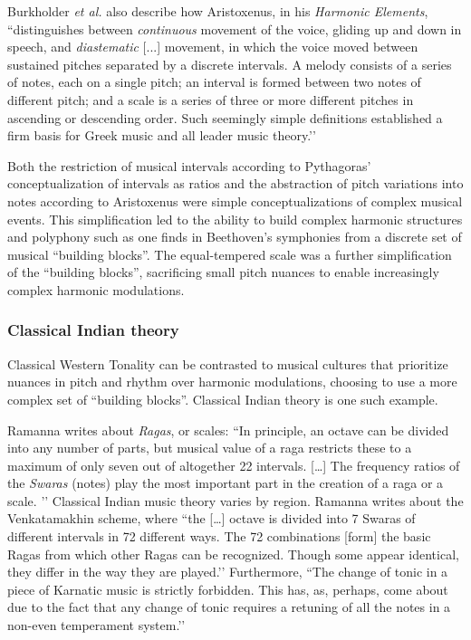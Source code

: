 Burkholder \textit{et al.} also describe how Aristoxenus, in his \textit{Harmonic Elements}, ``distinguishes between \textit{continuous} movement of the voice, gliding up and down in speech, and \textit{diastematic} [...] movement, in which the voice moved between sustained pitches separated by a discrete intervals. A melody consists of a series of notes, each on a single pitch; an interval is formed between two notes of different pitch; and a scale is a series of three or more different pitches in ascending or descending order. Such seemingly simple definitions established a firm basis for Greek music and all leader music theory.’’ \cite[Ch.~1, p.~15]{burkholder2010history} 

Both the restriction of musical intervals according to Pythagoras' conceptualization of intervals as ratios and the abstraction of pitch variations into notes according to Aristoxenus were simple conceptualizations of complex musical events. This simplification led to the ability to build complex harmonic structures and polyphony such as one finds in Beethoven's symphonies from a discrete set of musical ``building blocks''. The equal-tempered scale was a further simplification of the ``building blocks'', sacrificing small pitch nuances to enable increasingly complex harmonic modulations. 

\subsubsection{Classical Indian theory}
Classical Western Tonality can be contrasted to musical cultures that prioritize nuances in pitch and rhythm over harmonic modulations, choosing to use a more complex set of ``building blocks''. Classical Indian theory is one such example. 

Ramanna writes about \textit{Ragas}, or scales: ``In principle, an octave can be divided into any number of parts, but musical value of a raga restricts these to a maximum of only seven out of altogether 22 intervals. […] The frequency ratios of the \textit{Swaras} (notes) play the most important part in the creation of a raga or a scale. ’’ \cite[p.~897]{ramanna1995structure} Classical Indian music theory varies by region. Ramanna writes about the Venkatamakhin scheme, where ``the […] octave is divided into 7 Swaras of different intervals in 72 different ways. The 72 combinations [form] the basic Ragas from which other Ragas can be recognized. Though some appear identical, they differ in the way they are played.’’ \cite[p.~898]{ramanna1995structure} Furthermore, ``The change of tonic in a piece of Karnatic music is strictly forbidden. This has, as, perhaps, come about due to the fact that any change of tonic requires a retuning of all the notes in a non-even temperament system.’’ \cite[p.~899]{ramanna1995structure}


